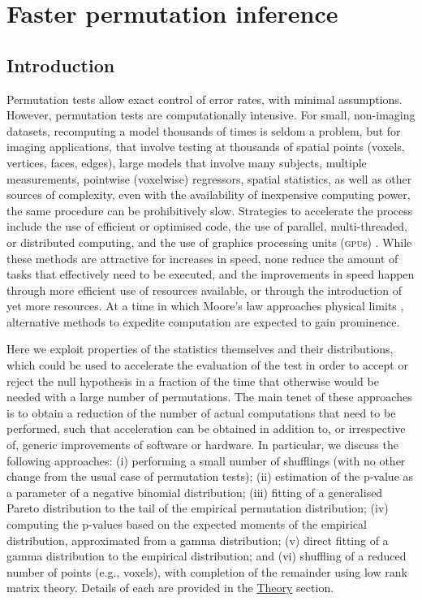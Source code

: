 \chapter{Faster permutation inference}
\setstretch{\lspac}

\section{Introduction}
\label{sec:accel:intro}
\setstretch{\lspac}

Permutation tests allow exact control of error rates, with minimal assumptions. However, permutation tests are computationally intensive. For small, non-imaging datasets, recomputing a model thousands of times is seldom a problem, but for imaging applications, that involve testing at thousands of spatial points (voxels, vertices, faces, edges), large models that involve many subjects, multiple measurements, pointwise (voxelwise) regressors, spatial statistics, as well as other sources of complexity, even with the availability of inexpensive computing power, the same procedure can be prohibitively slow. Strategies to accelerate the process include the use of efficient or optimised code, the use of parallel, multi-threaded, or distributed computing, and the use of graphics processing units (\textsc{gpu}s) \citep[for example applications of the latter, see][]{Eklund2012, Eklund2013, Hernandez2013}. While these methods are attractive for increases in speed, none reduce the amount of tasks that effectively need to be executed, and the improvements in speed happen through more efficient use of resources available, or through the introduction of yet more resources. At a time in which Moore's law \citep{Moore1965} approaches physical limits \citep{Waldrop2016}, alternative methods to expedite computation are expected to gain prominence.

Here we exploit properties of the statistics themselves and their distributions, which could be used to accelerate the evaluation of the test in order to accept or reject the null hypothesis in a fraction of the time that otherwise would be needed with a large number of permutations. The main tenet of these approaches is to obtain a reduction of the number of actual computations that need to be performed, such that acceleration can be obtained in addition to, or irrespective of, generic improvements of software or hardware. In particular, we discuss the following approaches: ({i}) performing a small number of shufflings (with no other change from the usual case of permutation tests); ({ii}) estimation of the p-value as a parameter of a negative binomial distribution; ({iii}) fitting of a generalised Pareto distribution to the tail of the empirical permutation distribution; ({iv}) computing the p-values based on the expected moments of the empirical distribution, approximated from a gamma distribution; ({v}) direct fitting of a gamma distribution to the empirical distribution; and ({vi}) shuffling of a reduced number of points (e.g., voxels), with completion of the remainder using low rank matrix theory. Details of each are provided in the \href{sec:accel:theory}{Theory} section.

